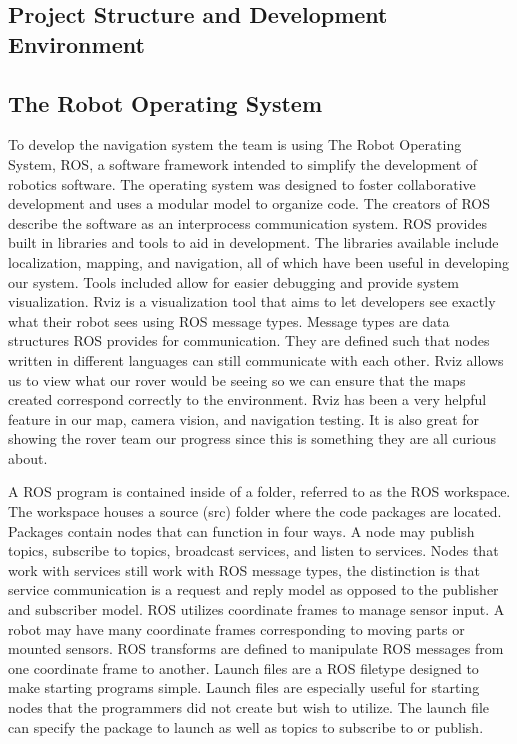\documentclass[10pt, oneside,onecolumn]{IEEEtran}
\begin{document}
\begin{titlepage}
\section{Project Structure and Development Environment}
\subsection{The Robot Operating System }
To develop the navigation system the team is using The Robot Operating System, ROS, a software framework intended to simplify the development of robotics software. The operating system was designed to foster collaborative development and uses a modular model to organize code. The creators of ROS describe the software as an interprocess communication system. ROS provides built in libraries and tools to aid in development. The libraries available include localization, mapping, and navigation, all of which have been useful in developing our system. Tools included allow for easier debugging and provide system visualization. Rviz is a visualization tool that aims to let developers see exactly what their robot sees using ROS message types. Message types are data structures ROS provides for communication. They are defined such that nodes written in different languages can still communicate with each other. Rviz allows us to view what our rover would be seeing so we can ensure that the maps created correspond correctly to the environment. Rviz has been a very helpful feature in our map, camera vision, and navigation testing. It is also great for showing the rover team our progress since this is something they are all curious about.

A ROS program is contained inside of a folder, referred to as the ROS workspace. The workspace houses a source (src) folder where the code packages are located. Packages contain nodes that can function in four ways. A node may publish topics, subscribe to topics, broadcast services, and listen to services. Nodes that work with services still work with ROS message types, the distinction is that service communication is a request and reply model as opposed to the publisher and subscriber model. ROS utilizes coordinate frames to manage sensor input. A robot may have many coordinate frames corresponding to moving parts or mounted sensors. ROS transforms are defined to manipulate ROS messages from one coordinate frame to another. Launch files are a ROS filetype designed to make starting programs simple. Launch files are especially useful for starting nodes that the programmers did not create but wish to utilize. The launch file can specify the package to launch as well as topics to subscribe to or publish. 


\end{titlepage}
\end{document}
